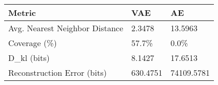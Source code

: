 \begin{tabular}{lll}
\toprule
Metric & VAE & AE \\
\midrule
Avg. Nearest Neighbor Distance & 2.3478 & 13.5963 \\
Coverage (\%) & 57.7\% & 0.0\% \\
D\_kl (bits) & 8.1427 & 17.6513 \\
Reconstruction Error (bits) & 630.4751 & 74109.5781 \\
\bottomrule
\end{tabular}
